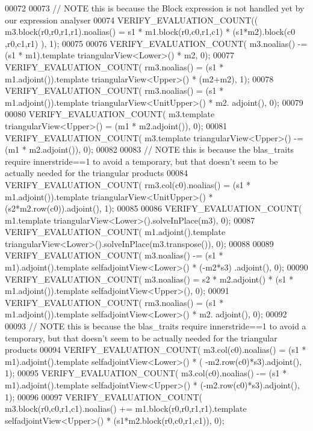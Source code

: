 \begin{DoxyCode}
00072 
00073   \textcolor{comment}{// NOTE this is because the Block expression is not handled yet by our expression analyser}
00074   VERIFY\_EVALUATION\_COUNT(( m3.block(r0,r0,r1,r1).noalias() = s1 * m1.block(r0,c0,r1,c1) * (s1*m2).block(c0
      ,r0,c1,r1) ), 1);
00075 
00076   VERIFY\_EVALUATION\_COUNT( m3.noalias() -= (s1 * m1).\textcolor{keyword}{template} triangularView<Lower>() * m2, 0);
00077   VERIFY\_EVALUATION\_COUNT( rm3.noalias() = (s1 * m1.adjoint()).\textcolor{keyword}{template} triangularView<Upper>() * (m2+m2), 
      1);
00078   VERIFY\_EVALUATION\_COUNT( rm3.noalias() = (s1 * m1.adjoint()).\textcolor{keyword}{template} triangularView<UnitUpper>() * m2.
      adjoint(), 0);
00079 
00080   VERIFY\_EVALUATION\_COUNT( m3.template triangularView<Upper>() = (m1 * m2.adjoint()), 0);
00081   VERIFY\_EVALUATION\_COUNT( m3.template triangularView<Upper>() -= (m1 * m2.adjoint()), 0);
00082 
00083   \textcolor{comment}{// NOTE this is because the blas\_traits require innerstride==1 to avoid a temporary, but that doesn't
       seem to be actually needed for the triangular products}
00084   VERIFY\_EVALUATION\_COUNT( rm3.col(c0).noalias() = (s1 * m1.adjoint()).\textcolor{keyword}{template} triangularView<UnitUpper>()
       * (s2*m2.row(c0)).adjoint(), 1);
00085 
00086   VERIFY\_EVALUATION\_COUNT( m1.template triangularView<Lower>().solveInPlace(m3), 0);
00087   VERIFY\_EVALUATION\_COUNT( m1.adjoint().template triangularView<Lower>().solveInPlace(m3.transpose()), 0);
00088 
00089   VERIFY\_EVALUATION\_COUNT( m3.noalias() -= (s1 * m1).adjoint().template selfadjointView<Lower>() * (-m2*s3)
      .adjoint(), 0);
00090   VERIFY\_EVALUATION\_COUNT( m3.noalias() = s2 * m2.adjoint() * (s1 * m1.adjoint()).\textcolor{keyword}{template} 
      selfadjointView<Upper>(), 0);
00091   VERIFY\_EVALUATION\_COUNT( rm3.noalias() = (s1 * m1.adjoint()).\textcolor{keyword}{template} selfadjointView<Lower>() * m2.
      adjoint(), 0);
00092 
00093   \textcolor{comment}{// NOTE this is because the blas\_traits require innerstride==1 to avoid a temporary, but that doesn't
       seem to be actually needed for the triangular products}
00094   VERIFY\_EVALUATION\_COUNT( m3.col(c0).noalias() = (s1 * m1).adjoint().template selfadjointView<Lower>() * (
      -m2.row(c0)*s3).adjoint(), 1);
00095   VERIFY\_EVALUATION\_COUNT( m3.col(c0).noalias() -= (s1 * m1).adjoint().template selfadjointView<Upper>() * 
      (-m2.row(c0)*s3).adjoint(), 1);
00096 
00097   VERIFY\_EVALUATION\_COUNT( m3.block(r0,c0,r1,c1).noalias() += m1.block(r0,r0,r1,r1).template 
      selfadjointView<Upper>() * (s1*m2.block(r0,c0,r1,c1)), 0);

\end{DoxyCode}
